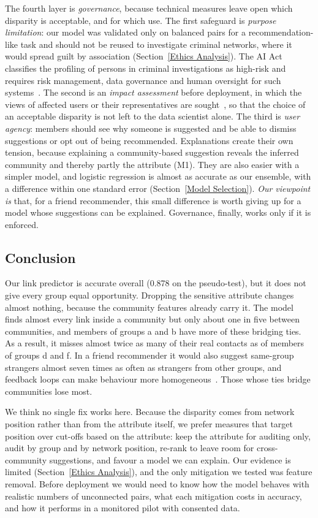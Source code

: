 \documentclass[runningheads]{llncs}
\begin{document}
The fourth layer is \emph{governance}, because technical measures leave open which disparity is acceptable, and for which use. The first safeguard is \emph{purpose limitation}: our model was validated only on balanced pairs for a recommendation-like task and should not be reused to investigate criminal networks, where it would spread guilt by association (Section~\ref{Ethics Analysis}). The AI Act classifies the profiling of persons in criminal investigations as high-risk and requires risk management, data governance and human oversight for such systems~\cite[Annex~III; Arts.~9, 10, 14]{aiact2024}. The second is an \emph{impact assessment} before deployment, in which the views of affected users or their representatives are sought~\cite[Art.~35(9)]{gdpr2016}, so that the choice of an acceptable disparity is not left to the data scientist alone. The third is \emph{user agency}: members should see why someone is suggested and be able to dismiss suggestions or opt out of being recommended. Explanations create their own tension, because explaining a community-based suggestion reveals the inferred community and thereby partly the attribute (M1). They are also easier with a simpler model, and logistic regression is almost as accurate as our ensemble, with a difference within one standard error (Section~\ref{Model Selection}). \emph{Our viewpoint is} that, for a friend recommender, this small difference is worth giving up for a model whose suggestions can be explained. Governance, finally, works only if it is enforced.

\subsection{Conclusion}
\label{Ethics Conclusion}
Our link predictor is accurate overall (0.878 on the pseudo-test), but it does not give every group equal opportunity. Dropping the sensitive attribute changes almost nothing, because the community features already carry it. The model finds almost every link inside a community but only about one in five between communities, and members of groups a and b have more of these bridging ties. As a result, it misses almost twice as many of their real contacts as of members of groups d and f. In a friend recommender it would also suggest same-group strangers almost seven times as often as strangers from other groups, and feedback loops can make behaviour more homogeneous~\cite{chaney2018}. Those whose ties bridge communities lose most.

We think no single fix works here. Because the disparity comes from network position rather than from the attribute itself, we prefer measures that target position over cut-offs based on the attribute: keep the attribute for auditing only, audit by group and by network position, re-rank to leave room for cross-community suggestions, and favour a model we can explain. Our evidence is limited (Section~\ref{Ethics Analysis}), and the only mitigation we tested was feature removal. Before deployment we would need to know how the model behaves with realistic numbers of unconnected pairs, what each mitigation costs in accuracy, and how it performs in a monitored pilot with consented data.
\newpage
\end{document}
